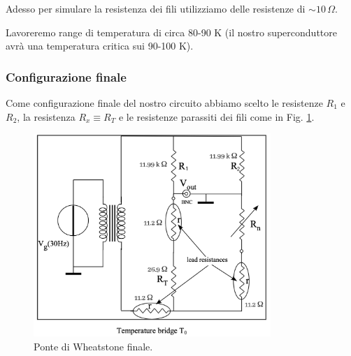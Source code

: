 \documentclass[../main/main.tex]{subfiles}
\begin{document}
Adesso per simulare la resistenza dei fili utilizziamo delle resistenze di \( \sim 10 \, \Omega  \).

\begin{remark}
Lavoreremo range di temperatura di circa 80-90 K (il nostro superconduttore avrà una temperatura critica sui 90-100 K).
\end{remark}

\subsubsection{Configurazione finale}
Come configurazione finale del nostro circuito abbiamo scelto le resistenze \( R_1 \) e \( R_2 \), la resistenza \( R_x \equiv R_T \) e le resistenze parassiti dei fili come in Fig. \ref{fig:2_2}.

\begin{figure}[h!]
\centering
\includegraphics[width=0.8\textwidth]{../lessons/image/02/2.png}
\caption{\label{fig:2_2} Ponte di Wheatstone finale.}
\end{figure}
\end{document}
